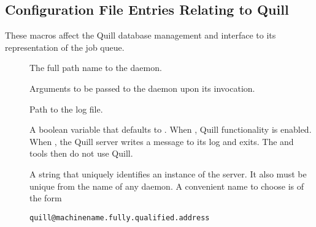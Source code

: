 \subsection{\label{sec:Quill-Config-File-Entries}Configuration File
Entries Relating to Quill}

These macros affect the Quill database
management and interface to its representation of the job queue.

\begin{description}
\item[] \label{param:Quill}  The full path name to the
   daemon.

\item[] \label{param:QuillArgs} Arguments
  to be passed to the  daemon upon its invocation.

\item[] \label{param:QuillLog}
  Path to the log file.

\item[] \label{param:QuillEnabled}
  A boolean variable that defaults to .
  When , Quill functionality is enabled.
  When , the Quill server writes a message to its log and exits.
  The  and  tools then do not use Quill.

\item[] \label{param:QuillName}
  A string that uniquely identifies an instance of the 
  server.  It also must be unique from the name of any 
  daemon.
  A convenient name to choose is of the form
\footnotesize
\begin{verbatim}
quill@machinename.fully.qualified.address
\end{verbatim}
\normalsize

\item[] \label{param:QuillDBName}

\item[] \label{param:QuillDBIPAddr}

\item[] \label{param:QuillPollingPeriod}

\item[] 
  \label{param:QuillHistoryCleaningInterval}


\end{description}
